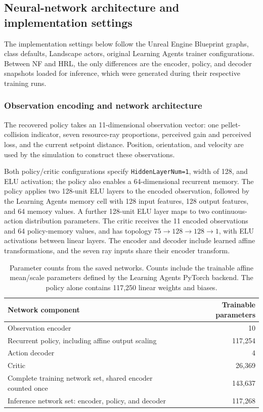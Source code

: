 
\subsection{Neural-network architecture and implementation settings}
\label{app:implementation-settings}

The implementation settings below follow the Unreal Engine Blueprint graphs, class defaults, Landscape actors, original Learning Agents trainer configurations. Between NF and HRL, the only differences are the encoder, policy, and decoder snapshots loaded for inference, which were generated during their respective training runs.

\subsubsection{Observation encoding and network architecture}

The recovered policy takes an 11-dimensional observation vector: one pellet-collision indicator, seven resource-ray proportions, perceived gain and perceived loss, and the current setpoint distance. Position, orientation, and velocity are used by the simulation to construct these observations.

Both policy/critic configurations specify \texttt{HiddenLayerNum=1}, width of 128, and ELU activation; the policy also enables a 64-dimensional recurrent memory. The policy applies two 128-unit ELU layers to the encoded observation, followed by the Learning Agents memory cell with 128 input features, 128 output features, and 64 memory values. A further 128-unit ELU layer maps to two continuous-action distribution parameters. The critic receives the 11 encoded observations and 64 policy-memory values, and has topology $75\rightarrow128\rightarrow128\rightarrow1$, with ELU activations between linear layers. The encoder and decoder include learned affine transformations, and the seven ray inputs share their encoder transform.

\begin{table}[H]
  \centering
  \small
  \begin{tabular}{@{}lr@{}}
    \toprule
    \textbf{Network component} & \textbf{Trainable parameters} \\
    \midrule
    Observation encoder & 10 \\
    Recurrent policy, including affine output scaling & 117,254 \\
    Action decoder & 4 \\
    Critic & 26,369 \\
    \midrule
    Complete training network set, shared encoder counted once & 143,637 \\
    Inference network set: encoder, policy, and decoder & 117,268 \\
    \bottomrule
  \end{tabular}
  \caption{Parameter counts from the saved networks. Counts include the trainable affine mean/scale parameters defined by the Learning Agents PyTorch backend. The policy alone contains 117,250 linear weights and biases.}
  \label{tab:network-parameters}
\end{table}

